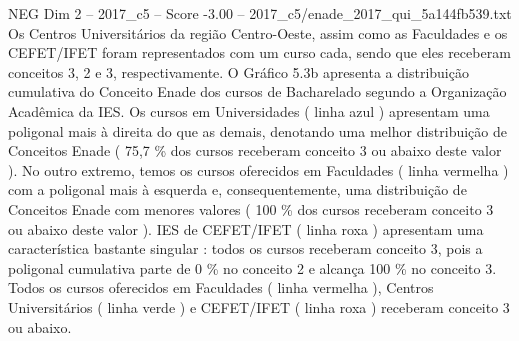 \begin{textsample}{NEG Dim 2 – 2017\_c5 – Score -3.00 – 2017\_c5/enade\_2017\_qui\_5a144fb539.txt}
Os Centros Universitários da região Centro-Oeste, assim como as Faculdades e os CEFET/IFET foram representados com um curso cada, sendo que eles receberam conceitos 3, 2 e 3, respectivamente.
O Gráfico 5.3b apresenta a distribuição cumulativa do Conceito Enade dos cursos de Bacharelado segundo a Organização Acadêmica da IES.
Os cursos em Universidades ( linha azul ) apresentam uma poligonal mais à direita do que as demais, denotando uma melhor distribuição de Conceitos Enade ( 75,7 \% dos cursos receberam conceito 3 ou abaixo deste valor ).
No outro extremo, temos os cursos oferecidos em Faculdades ( linha vermelha ) com a poligonal mais à esquerda e, consequentemente, uma distribuição de Conceitos Enade com menores valores ( 100 \% dos cursos receberam conceito 3 ou abaixo deste valor ).
IES de CEFET/IFET ( linha roxa ) apresentam uma característica bastante singular : todos os cursos receberam conceito 3, pois a poligonal cumulativa parte de 0 \% no conceito 2 e alcança 100 \% no conceito 3.
Todos os cursos oferecidos em Faculdades ( linha vermelha ), Centros Universitários ( linha verde ) e CEFET/IFET ( linha roxa ) receberam conceito 3 ou abaixo.

\end{textsample}

